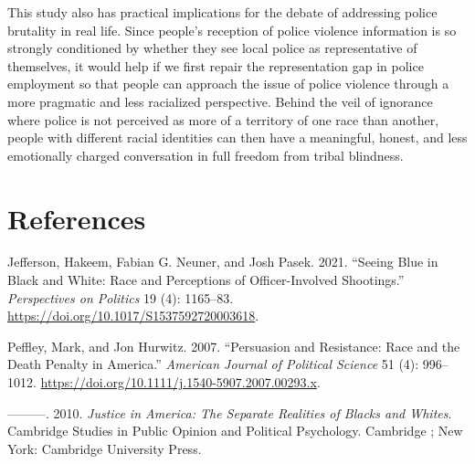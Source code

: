 \documentclass[
  12pt,
]{article}
\newlength{\cslhangindent}
\newlength{\cslentryspacingunit} %
\newenvironment{CSLReferences}[2] %
 {%
  \setlength{\parindent}{0pt}
  \ifodd #1
  \let\oldpar\par
  \def\par{\hangindent=\cslhangindent\oldpar}
  \fi
  \setlength{\parskip}{#2\cslentryspacingunit}
 }%
 {}
\begin{document}
This study also has practical implications for the debate of addressing
police brutality in real life. Since people's reception of police
violence information is so strongly conditioned by whether they see
local police as representative of themselves, it would help if we first
repair the representation gap in police employment so that people can
approach the issue of police violence through a more pragmatic and less
racialized perspective. Behind the veil of ignorance where police is not
perceived as more of a territory of one race than another, people with
different racial identities can then have a meaningful, honest, and less
emotionally charged conversation in full freedom from tribal blindness.

\hypertarget{references}{%
\section*{References}\label{references}}

\hypertarget{refs}{}
\begin{CSLReferences}{1}{0}
\leavevmode{}%
Jefferson, Hakeem, Fabian G. Neuner, and Josh Pasek. 2021. {``Seeing
Blue in Black and White: Race and Perceptions of Officer-Involved
Shootings.''} \emph{Perspectives on Politics} 19 (4): 1165--83.
\url{https://doi.org/10.1017/S1537592720003618}.

\leavevmode{}%
Peffley, Mark, and Jon Hurwitz. 2007. {``Persuasion and Resistance: Race
and the Death Penalty in America.''} \emph{American Journal of Political
Science} 51 (4): 996--1012.
\url{https://doi.org/10.1111/j.1540-5907.2007.00293.x}.

\leavevmode{}%
---------. 2010. \emph{Justice in America: The Separate Realities of
Blacks and Whites}. Cambridge Studies in Public Opinion and Political
Psychology. Cambridge ; New York: Cambridge University Press.

\end{CSLReferences}
\end{document}
